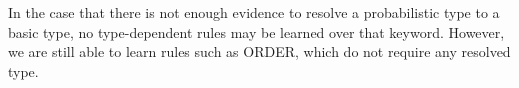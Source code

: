 In the case that there is not enough evidence to resolve a probabilistic type to a basic type, no type-dependent rules may be learned over that keyword.
However, we are still able to learn rules such as {\scriptsize ORDER}, which do not require any resolved type. 




